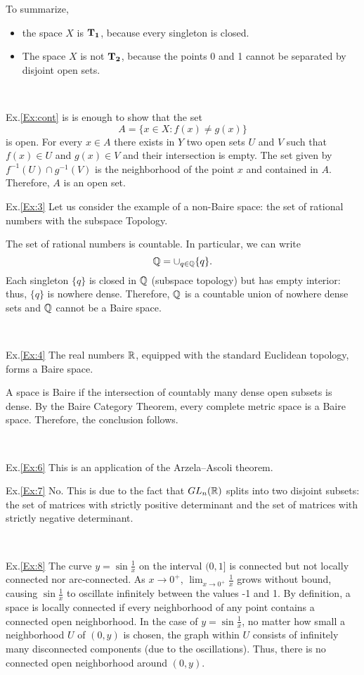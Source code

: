To summarize,
\begin{itemize}
    \item the space $X$ is ${\bf T_1}$, because every singleton is closed.
    \item The space $X$ is not ${\bf T_2}$,
 because the points 0 and 1 cannot be separated by disjoint open sets.
 \end{itemize}
 
\, 

Ex.\ref{Ex:cont} is is enough to show that the set $$A=\{x\in X: f(x)\neq g(x)\}$$ is open. 
For every $x\in A$ there exists in $Y$ two open sets $U$ and $V$ such that $f(x)\in U$ and $g(x)\in V$ and their intersection is empty. 
The set given by $f^{-1}(U)\cap g^{-1}(V)$ is the neighborhood of the point $x$ and contained in $A$. Therefore, $A$ is an open set. 

Ex.\ref{Ex:3} Let us consider the example of a non-Baire space: the set of rational numbers with the subspace Topology.

The set of rational numbers is countable. In particular, we can write 
\[\mathbb{Q} =\cup_{q\in \mathbb{Q}}\{q\}.\] Each singleton $\{q\}$ is closed in $\mathbb{Q}$ (subspace topology) but has empty interior: thus, $\{q\}$ is nowhere dense. Therefore, $\mathbb{Q}$ is a countable union of nowhere dense sets and $\mathbb{Q}$ cannot be a Baire space. 

\, 

Ex.\ref{Ex:4} The real numbers $\mathbb{R}$, equipped with the standard Euclidean topology, forms a Baire space. 

A space is Baire if the intersection of countably many dense open subsets is dense.
By the Baire Category Theorem, every complete metric space is a Baire space. Therefore, the conclusion follows.

\, 


Ex.\ref{Ex:6} This is an application of the Arzela--Ascoli theorem.
\, 

Ex.\ref{Ex:7} No. This is due to the fact that $GL_n(\mathbb{R})$ splits into two disjoint subsets: the set of matrices with strictly positive determinant and the set of matrices with strictly negative determinant. 

\, 

Ex.\ref{Ex:8} The curve $y=\sin\frac{1}{x}$ on the interval $(0,1]$ is connected but not locally connected nor arc-connected. 
As $x\to 0^+$, $\lim_{x\to 0^+}\frac{1}{x}$ grows without bound, causing $\sin\frac{1}{x}$ to oscillate infinitely between the values -1 and 1. By definition, a space is locally connected if every neighborhood of any point contains a connected open neighborhood.
In the case of $y=\sin\frac{1}{x}$, no matter how small a neighborhood $U$ of $(0,y)$ is chosen, the graph within 
$U$ consists of infinitely many disconnected components (due to the oscillations). Thus, there is no connected open neighborhood around $(0,y)$.

